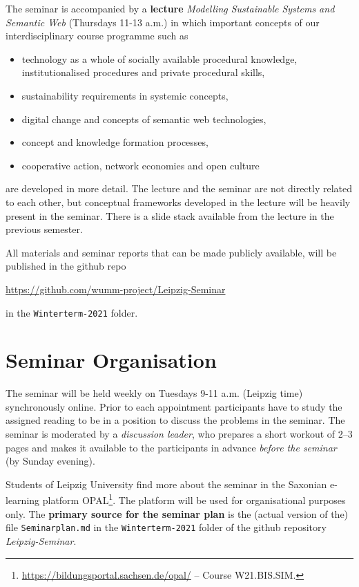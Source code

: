 \documentclass[11pt,a4paper]{article}
\begin{document}
The seminar is accompanied by a \textbf{lecture} \emph{Modelling Sustainable
  Systems and Semantic Web} (Thursdays 11-13 a.m.) in which important concepts
of our interdisciplinary course programme such as
\begin{itemize}[noitemsep]
\item technology as a whole of socially available procedural knowledge,
  institutionalised procedures and private procedural skills, 
\item sustainability requirements in systemic concepts,
\item digital change and concepts of semantic web technologies,
\item concept and knowledge formation processes,
\item cooperative action, network economies and open culture
\end{itemize}
are developed in more detail. The lecture and the seminar are not directly
related to each other, but conceptual frameworks developed in the lecture will
be heavily present in the seminar. There is a slide stack \cite{Graebe2021}
available from the lecture in the previous semester.

All materials and seminar reports that can be made publicly available, will be
published in the github repo
\begin{center}
  \url{https://github.com/wumm-project/Leipzig-Seminar}
\end{center}
in the \texttt{Winterterm-2021} folder.

\section{Seminar Organisation}

The seminar will be held weekly on Tuesdays 9-11 a.m. (Leipzig time)
synchronously online.  Prior to each appointment participants have to study
the assigned reading to be in a position to discuss the problems in the
seminar.  The seminar is moderated by a \emph{discussion leader}, who prepares
a short workout of 2--3 pages and makes it available to the participants in
advance \emph{before the seminar} (by Sunday evening).

Students of Leipzig University find more about the seminar in the Saxonian
e-learning platform
OPAL\footnote{\url{https://bildungsportal.sachsen.de/opal/} -- Course
  W21.BIS.SIM.}.  The platform will be used for organisational purposes only.
The \textbf{primary source for the seminar plan} is the (actual version of
the) file \texttt{Seminarplan.md} in the \texttt{Winterterm-2021} folder of
the github repository \emph{Leipzig-Seminar}.
\end{document}
